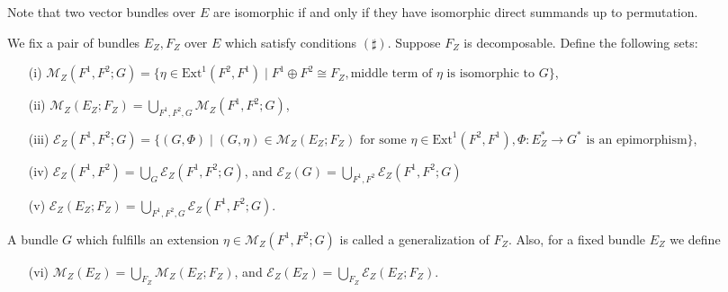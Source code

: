 \documentclass[12pt,oneside,reqno]{amsart}
\theoremstyle{definition}
\begin{document}
Note that two vector bundles over $E$ are isomorphic if and only if they have isomorphic direct summands up to permutation. 

We fix a pair of bundles $E_Z, F_Z$ over $E$ which satisfy conditions $(\sharp)$. Suppose $F_Z$ is decomposable. Define the following sets: 
\begin{itemize}
\item[(i)] 
$\mathcal{M}_Z(F^1, F^2; G) = \{\eta \in \mathrm{Ext}^1(F^2, F^1) \mid F^1 \oplus F^2 \cong F_Z, \textrm{middle term of $\eta$ is isomorphic to $G$}\}$,
\item[(ii)] 
$\mathcal{M}_Z(E_Z; F_Z) = \bigcup_{F^1, F^2, G}\mathcal{M}_Z(F^1, F^2; G)$,
\item[(iii)] 
$\mathcal{E}_Z(F^1, F^2; G) = \{(G, \Phi) \mid (G, \eta) \in \mathcal{M}_Z(E_Z; F_Z) \textrm{ for some } \eta \in \mathrm{Ext}^1(F^2, F^1), \Phi: E_Z^* \to G^* \textrm{ is an epimorphism} \}$,
\item[(iv)] 
$\mathcal{E}_Z(F^1, F^2) = \bigcup_{G}\mathcal{E}_Z(F^1, F^2; G)$, and $\mathcal{E}_Z(G) = \bigcup_{F^1, F^2}\mathcal{E}_Z(F^1, F^2; G)$ 
\item[(v)] 
$\mathcal{E}_Z(E_Z; F_Z) = \bigcup_{F^1, F^2, G}\mathcal{E}_Z(F^1, F^2; G)$.
\end{itemize}
A bundle $G$ which fulfills an extension $\eta \in \mathcal{M}_Z(F^1, F^2; G)$ is called a generalization of $F_Z$. Also, for a fixed bundle $E_Z$ we define
\begin{itemize}
\item[(vi)] $\mathcal{M}_Z(E_Z) = \bigcup_{F_Z}\mathcal{M}_Z(E_Z; F_Z)$, and $\mathcal{E}_Z(E_Z) = \bigcup_{F_Z}\mathcal{E}_Z(E_Z; F_Z)$.
\end{itemize}
\end{document}

